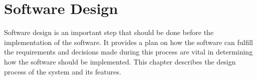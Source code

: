 \section{Software Design}

Software design is an important step that should be done before the implementation of the software. It provides a plan on how the software can fulfill the requirements and decisions made during this process are vital in determining how the software should be implemented. This chapter describes the design process of the system and its features. 



 